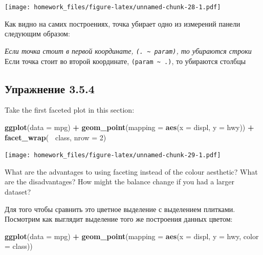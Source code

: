 \documentclass[]{book}
\newenvironment{Shaded}{\begin{snugshade}}{\end{snugshade}}
\newcommand{\KeywordTok}[1]{\textcolor[rgb]{0.13,0.29,0.53}{\textbf{#1}}}
\newcommand{\DataTypeTok}[1]{\textcolor[rgb]{0.13,0.29,0.53}{#1}}
\newcommand{\DecValTok}[1]{\textcolor[rgb]{0.00,0.00,0.81}{#1}}
\newcommand{\StringTok}[1]{\textcolor[rgb]{0.31,0.60,0.02}{#1}}
\newcommand{\OperatorTok}[1]{\textcolor[rgb]{0.81,0.36,0.00}{\textbf{#1}}}
\newcommand{\NormalTok}[1]{#1}
\begin{document}
\texttt{[image: homework\_files/figure-latex/unnamed-chunk-28-1.pdf]}

Как видно на самих построениях, точка убирает одно из измерений панели
следующим образом:

\emph{Если точка стоит в первой координате,
\texttt{(.\ \textasciitilde{}\ param)}, то убираются строки }Если точка
стоит во второй координате, \texttt{(param\ \textasciitilde{}\ .)}, то
убираются столбцы

\subsection*{Упражнение 3.5.4}\label{-3.5.4}

Take the first faceted plot in this section:

\begin{Shaded}
\begin{Highlighting}[]
\KeywordTok{ggplot}\NormalTok{(}\DataTypeTok{data =}\NormalTok{ mpg) }\OperatorTok{+}\StringTok{ }
\StringTok{  }\KeywordTok{geom_point}\NormalTok{(}\DataTypeTok{mapping =} \KeywordTok{aes}\NormalTok{(}\DataTypeTok{x =}\NormalTok{ displ, }\DataTypeTok{y =}\NormalTok{ hwy)) }\OperatorTok{+}\StringTok{ }
\StringTok{  }\KeywordTok{facet_wrap}\NormalTok{(}\OperatorTok{~}\StringTok{ }\NormalTok{class, }\DataTypeTok{nrow =} \DecValTok{2}\NormalTok{)}
\end{Highlighting}
\end{Shaded}

\texttt{[image: homework\_files/figure-latex/unnamed-chunk-29-1.pdf]}

What are the advantages to using faceting instead of the colour
aesthetic? What are the disadvantages? How might the balance change if
you had a larger dataset?

Для того чтобы сравнить это цветное выделение с выделением плитками.
Посмотрим как выглядит выделение того же построения данных цветом:

\begin{Shaded}
\begin{Highlighting}[]
\KeywordTok{ggplot}\NormalTok{(}\DataTypeTok{data =}\NormalTok{ mpg) }\OperatorTok{+}\StringTok{ }
\StringTok{   }\KeywordTok{geom_point}\NormalTok{(}\DataTypeTok{mapping =} \KeywordTok{aes}\NormalTok{(}\DataTypeTok{x =}\NormalTok{ displ, }\DataTypeTok{y =}\NormalTok{ hwy, }\DataTypeTok{color =}\NormalTok{ class))}
\end{Highlighting}
\end{Shaded}
\end{document}
